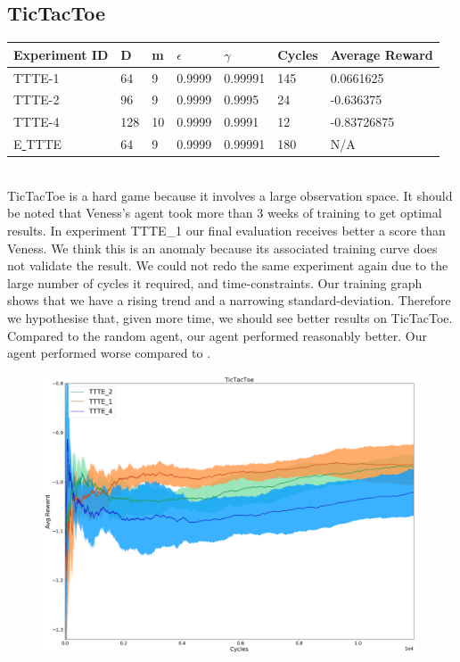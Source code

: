 \documentclass{article}
\theoremstyle{definition}
\newtheorem{primary statistics}[definition]{Primary Statistics}
\newtheorem{auxiliary statistics}[definition]{Auxiliary Statistics}
\begin{document}
\subsection{TicTacToe}
\begin{tabular}{|l|l|l|l|l|l|l|}
 \hline \centering
 Experiment ID& D & m & $\epsilon$ & $\gamma$ & Cycles & Average Reward \\ \hline
TTTE-1   & 64        & 9           & 0.9999      & 0.99991           & 145    & 0.0661625         \\ \hline
TTTE-2   & 96        & 9           & 0.9999      & 0.9995            & 24     & -0.636375         \\ \hline
TTTE-4   & 128       & 10          & 0.9999      & 0.9991            & 12     & -0.83726875  \\  \hline  
E\underline{ }TTTE  & 64       & 9          & 0.9999      & 0.99991            & 180     & N/A  \\  \hline    
\end{tabular} \\

TicTacToe is a hard game because it involves a large observation space. It should be noted that Veness’s agent took more than 3 weeks of training to get optimal results. In experiment TTTE\_1 our final evaluation receives better a score than Veness. We think this is an anomaly because its associated training curve does not validate the result. We could not redo the same experiment again due to the large number of cycles it required, and time-constraints. Our training graph shows that we have a rising trend and a narrowing standard-deviation. Therefore we hypothesise that, given more time, we should see better results on TicTacToe. Compared to the random agent, our agent performed reasonably better. Our agent performed worse compared to \cite{veness2011monte}.

 \begin{figure}[!htb]
 \centering
    \includegraphics[width=11.1cm]{4_TicTacToe}
\end{figure}
\end{document}
